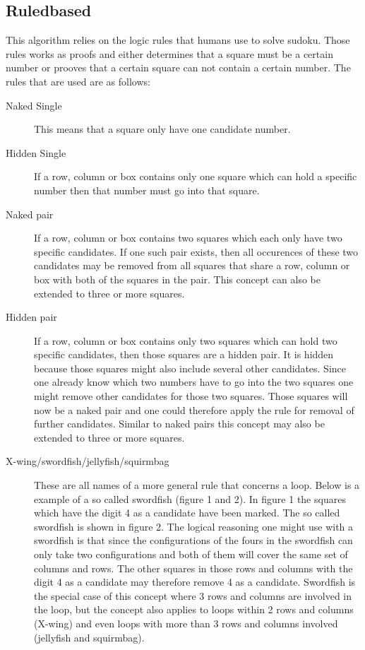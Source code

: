 \documentclass[a4paper,11pt]{kth-mag}
\begin{document}
\subsection{Ruledbased}
This algorithm relies on the logic rules that humans use to solve sudoku.
Those rules works as proofs and either determines that a square must be a certain number or prooves that a certain square can not contain a certain number.
The rules that are used are as follows:
\begin{description}
    \item[Naked Single] 
    This means that a square only have one candidate number.
    \item[Hidden Single] 
    If a row, column or box contains only one square which can hold a specific number then that number must go into that square.
    \item[Naked pair] 
    If a row, column or box contains two squares which each only have two specific candidates.
If one such pair exists, then all occurences of these two candidates may be removed from all squares that share a row, column or box with both of the squares in the pair.
This concept can also be extended to three or more squares.
    \item[Hidden pair]
    If a row, column or box contains only two squares which can hold two specific candidates, then those squares are a hidden pair.
It is hidden because those squares might also include several other candidates.
Since one already know which two numbers have to go into the two squares one might remove other candidates for those two squares.
Those squares will now be a naked pair and one could therefore apply the rule for removal of further candidates.
Similar to naked pairs this concept may also be extended to three or more squares.

    \item[X-wing/swordfish/jellyfish/squirmbag]
    These are all names of a more general rule that concerns a loop.
Below is a example of a so called swordfish (figure 1 and 2).
In figure 1 the squares which have the digit 4 as a candidate have been marked.
The so called swordfish is shown in figure 2.
The logical reasoning one might use with a swordfish is that since the configurations of the fours in the swordfish can only take two configurations and both of them will cover the same set of columns and rows.
The other squares in those rows and columns with the digit 4 as a candidate may therefore remove 4 as a candidate.
Swordfish is the special case of this concept where 3 rows and columns are involved in the loop, but the concept also applies to loops within 2 rows and columns (X-wing) and even loops with more than 3 rows and columns involved (jellyfish and squirmbag).


\end{description}
\end{document}
